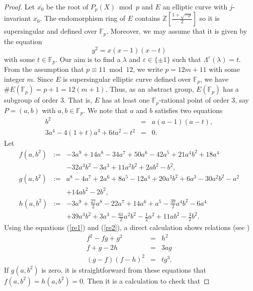 \documentclass[a4paper, 11pt]{article}
\theoremstyle{plain}
\newcommand{\?}{\textcolor{red}{??}}
\newcommand{\lm}{\lambda}
\newcommand{\Lm}{\Lambda}
\newcommand{\fp}{\mathbb{F}_p}
\newcommand{\bZ}{\mathbb{Z}}
\begin{document}
\begin{proof}
    Let $\overline{x_0}$ be the root of $P_p(X) \bmod p$ and $E$ an elliptic curve with $j$-invariant $\overline{x_0}$. The endomorphism ring of $E$ contains $\bZ\left [\frac{1+\sqrt{-p}}{2}  \right]$ so it is supersingular and defined over $\fp$. Moreover, we may assume that it is given by the equation
    \[
    y^2=x(x-1)(x-t)
    \]
    with some $t \in \fp$. Our aim is to find a $\lm$ and $\varepsilon\in\{\pm1\}$ such that $\Lm^{\varepsilon}(\lm)=t$. From the assumption that $p \equiv 11\bmod 12$, we write $p=12m+11$ with some integer $m$. Since $E$ is supersingular elliptic curve defined over $\fp$, we have $\#E(\fp)=p+1=12(m+1).$ Thus, as an abstract group, $E(\fp)$ has a subgroup of order $3$. That is, $E$ has at least one $\fp$-rational point of order $3$, say $P=(a,b)$ with $a,b \in \fp$. We note that $a$ and $b$ satisfies two equations
\begin{eqnarray}
     b^2 &=& a(a-1)(a-t), \label{re1}\\
     3a^4-4(1+t)a^3+6ta^2-t^2 &=& 0.\label{re2}
\end{eqnarray}
 Let 
\begin{eqnarray*}
    f(a,b^2)&:=&- 3a^9 + 14a^8 - 34a^7 +
    50a^6 - 42a^5 + 21a^4b^2 + 18a^4 \\
    &&- 32a^3b^2 - 3a^3  + 11a^2b^2 +
    2ab^2 - b^2,\\
    g(a,b^2)&:=&a^8 - 4a^7 + 2a^6 + 8a^5 - 12a^4 + 20a^3b^2 + 6a^3 -
    30a^2b^2 - a^2 \\
    &&+ 14ab^2 - 2b^2,\\
    h(a,b^2)&:=&-3a^9 + \frac{27}{2}a^8 - 22a^7 + 14a^6 + a^5 - \frac{39}{2}a^4b^2 - 6a^4\\
     &&+ 39a^3b^2  +
    3a^3 - \frac{61}{2}a^2b^2 - \frac{1}{2}a^2 + 11ab^2 - \frac{3}{2}b^2.
 \end{eqnarray*}
Using the equations (\ref{re1}) and (\ref{re2}), a direct calculation shows relations (see \cite[7]{Github})
    \begin{eqnarray}
        f^2-fg+g^2 &=& h^2 \label{eq1}\\
        f+g-2h &=& 3ag \label{eq2}\\
        (g-f)(f-h)^2 &=& tg^3.\label{eq3}
    \end{eqnarray}
    If $g(a,b^2)$ is zero, it is straightforward from these equations that $f(a,b^2)=h(a,b^2)=0$. Then it is a calculation to check that  

\end{proof}
\end{document}
